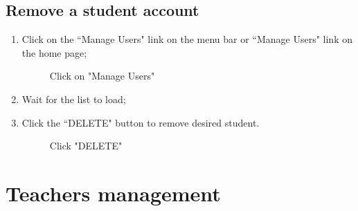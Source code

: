 \documentclass[ManualeUtente]{subfiles}
\begin{document}
	\subsection{Remove a student account}
	\begin{enumerate}
		\item Click on the \textquotedblleft Manage Users" link on the menu bar or \textquotedblleft Manage Users" link on the home page;
		\begin{figure}[H]
			\centering
			\caption{Click on "Manage Users"}
			\label{fig:Click on "Manage Users"}
		\end{figure}
		\item Wait for the list to load;
		\item Click the \textquotedblleft DELETE" button to remove desired student.
		\begin{figure}[H]
			\centering
			\caption{Click "DELETE"}
			\label{fig:Click "DELETE"}
		\end{figure}
	\end{enumerate}
	
	\section{Teachers management}
\end{document}
